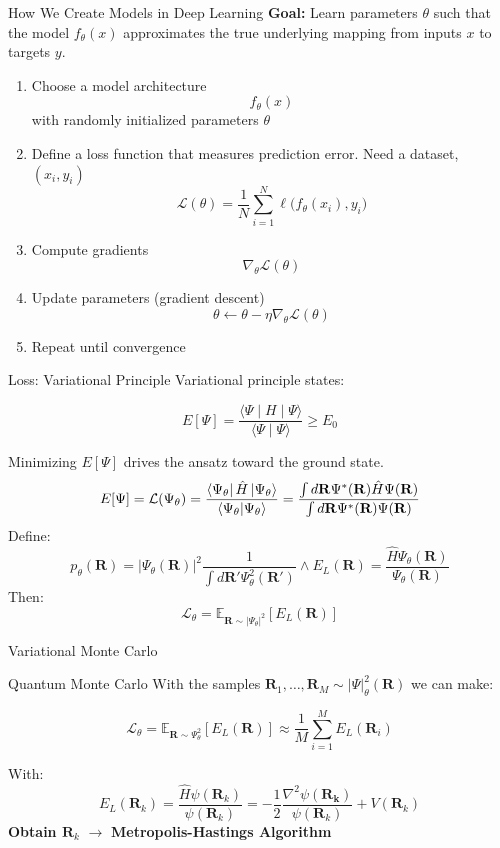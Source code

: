 \documentclass{beamer}
\begin{document}
\begin{frame}{How We Create Models in Deep Learning}
\textbf{Goal:} Learn parameters $\theta$ such that the model
$f_{\theta}(x)$ approximates the true underlying mapping
from inputs $x$ to targets $y$.
\begin{enumerate}
    \item Choose a model architecture
    \[
        f_{\theta}(x)
    \]
    with randomly initialized parameters $\theta$
    \item Define a loss function that measures prediction error. Need a dataset, $(x_i,y_i)$
    \[
        \mathcal{L}(\theta) = \frac{1}{N} \sum_{i=1}^{N}
        \ell\big(f_{\theta}(x_i), y_i\big)
    \]
    \item Compute gradients
    \[
        \nabla_{\theta} \mathcal{L}(\theta)
    \]
    \item Update parameters (gradient descent)
    \[
        \theta \leftarrow \theta - \eta \nabla_{\theta} \mathcal{L}(\theta)
    \]
    \item Repeat until convergence
\end{enumerate}
\end{frame}
\begin{frame}{Loss: Variational Principle}
Variational principle states:

$$E[\Psi] = \displaystyle \frac{\langle \Psi \mid H \mid \Psi \rangle}{\langle \Psi \mid \Psi \rangle} \ge E_0$$

Minimizing $E[\Psi]$ drives the ansatz toward the ground state.
$$
E[\Psi]=\mathcal{L}(\Psi_\theta)=\frac{\bra{\Psi_{\theta}} \hat{H}\ket{\Psi_{\theta}} }{\braket{ \Psi_{\theta}} }=\frac{\int d\mathbf{R}\Psi ^{*}(\mathbf{R})\hat{H}\Psi(\mathbf{R})}{\int d\mathbf{R}\Psi ^{*}(\mathbf{R})\Psi(\mathbf{R})}
$$
Define:
$$p_{\theta}(\mathbf{R})=|\Psi_{\theta}(\mathbf{R})|^{2}\frac{1}{\int  d\mathbf{R}'\Psi^{2}_{\theta}(\mathbf{R}')}\land E_{L}(\mathbf{R})=\frac{\hat{H}\Psi_{\theta}(\mathbf{R})}{\Psi_{\theta}(\mathbf{R})}
$$
Then:
\begin{equation}
\mathcal{L}_{\theta}=\mathbb{E}_{\mathbf{R}\sim |\Psi_{\theta}| ^{2}}[E_{L}(\mathbf{R})]
\end{equation}
\end{frame}
\begin{frame}{Variational Monte Carlo}
  \begin{block}{Quantum Monte Carlo}
With the samples $\mathbf{R}_{1},\dots,\mathbf{R}_{M}\sim |\Psi| ^{2}_{\theta}(\mathbf{R})$ we can make:

\begin{equation}
\mathcal{L}_{\theta}=\mathbb{E}_{\mathbf{R}\sim \Psi ^{2}_{\theta}}[E_{L}(\mathbf{R})]\approx \frac{1}{M}\sum_{i=1}^{M} E_{L}(\mathbf{R}_{i})
\end{equation}
\end{block}
With:
$$E_{L}(\mathbf{R}_{k})=\frac{\hat{H}\psi(\mathbf{R}_{k})}{\psi(\mathbf{R}_{k})}=-\frac{1}{2}\frac{\nabla^{2}\psi(\mathbf{R_{k}})}{\psi(\mathbf{R}_{k})}+V(\mathbf{R}_{k})
$$
\textbf{Obtain $\mathbf{R}_k$} $\to$ \textbf{Metropolis-Hastings Algorithm}
\end{frame}
\end{document}
